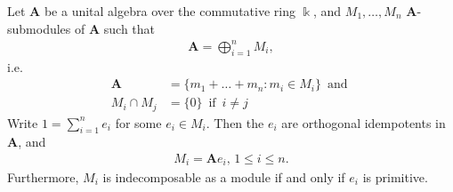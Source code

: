 \begin{proposition}\label{prop:idempotent}
Let $\mathbf{A}$ be a unital algebra over the commutative ring $\Bbbk$, and 
$M_{1},\dots,M_{n}$ $\mathbf{A}$-submodules of $\mathbf{A}$ such that
\begin{align}
\mathbf{A} = \bigoplus_{i=1}^{n} M_{i},
\end{align}
i.e.
\begin{align}
\mathbf{A} &= \{ m_{1} + \dots + m_{n} : m_{i} \in M_{i} \}\, \text{ and }\\
M_{i} \cap M_{j} &= \{0\}\, \text{ if }\, i\neq j 
\end{align}
Write $1 = \sum_{i=1}^{n} e_{i}$ for some $e_{i} \in M_{i}$. Then the $e_{i}$ are orthogonal idempotents in $\mathbf{A}$, and
\begin{align}
M_{i} = \mathbf{A} e_{i},\, 1\leq i \leq n.
\end{align}
Furthermore, $M_{i}$ is indecomposable as a module if and only if $e_{i}$ is primitive.
\end{proposition}
